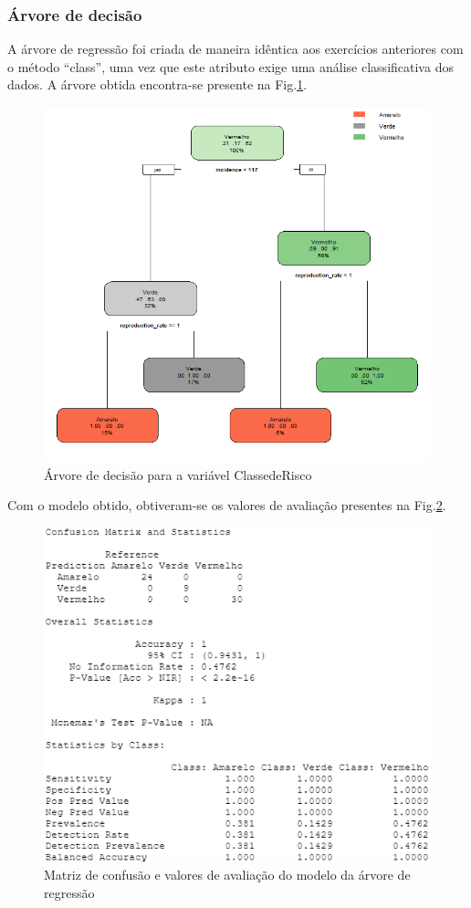 \documentclass[conference]{IEEEtran}
\begin{document}
\subsubsection{Árvore de decisão}
A árvore de regressão foi criada de maneira idêntica aos exercícios anteriores com o método “class”, uma vez que este atributo exige uma análise classificativa dos dados. A árvore obtida encontra-se presente na Fig.\ref{8a_rpart}.
\begin{figure}[htbp]
\centerline{\includegraphics[width=0.95\columnwidth]{images/08_1.png}}
\caption{Árvore de decisão para a variável ClassedeRisco}
\label{8a_rpart}
\end{figure}
Com o modelo obtido, obtiveram-se os valores de avaliação presentes na Fig.\ref{8a_confusionmatrix}.
\begin{figure}[htbp]
\centerline{\includegraphics[width=0.95\columnwidth]{images/08_2.png}}
\caption{Matriz de confusão e valores de avaliação do modelo da árvore de regressão}
\label{8a_confusionmatrix}
\end{figure}
\end{document}
